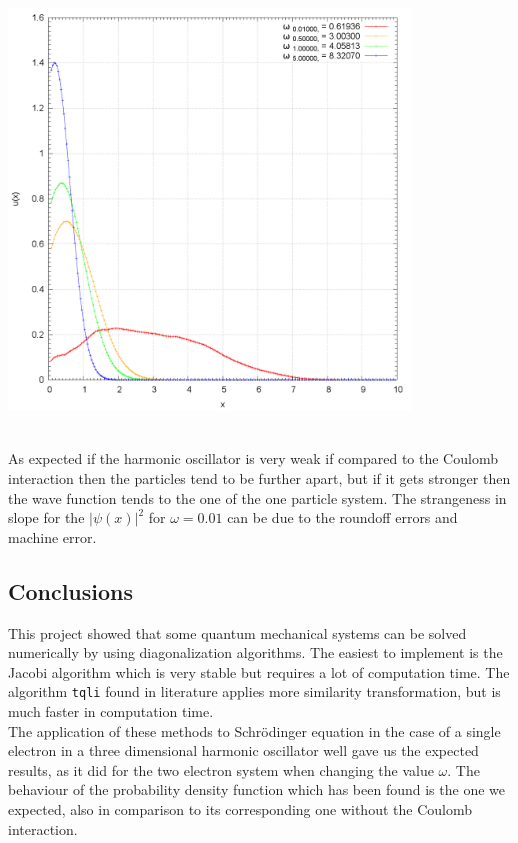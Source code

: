 \documentclass[10pt,a4paper,titlepage]{article}
\begin{document}
\begin{minipage}{0.5\textwidth}
	\includegraphics[width=0.8\textwidth]{plot_omega.png}
\end{minipage}\\
As expected if the harmonic oscillator is very weak if compared to the Coulomb interaction then the particles tend to be further apart, but if it gets 
stronger then the wave function tends to the one of the one particle system. The strangeness in slope for the $|\psi(x)|^2$ for $\omega = 0.01$ can be
due to the roundoff errors and machine error.

\subsection*{Conclusions}
This project showed that some quantum mechanical systems can be solved numerically by using diagonalization algorithms. The easiest to implement is the 
Jacobi algorithm which is very stable but requires a lot of computation time. The algorithm \texttt{tqli} found in literature applies more similarity
transformation, but is much faster in computation time. \\
The application of these methods to Schr\"odinger equation in the case of a single electron in a three dimensional harmonic oscillator well
gave us the expected results, as it did for the two electron system when changing the value $\omega$. The behaviour of the probability
density function which has been found is the one we expected, also in comparison to its corresponding one without the Coulomb interaction. 
\end{document}

